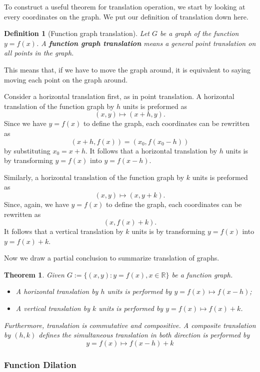 \documentclass[12pt]{article}
\newtheorem{definition}{Definition}[section]
\newtheorem*{theorem}{Theorem}
\begin{document}
    To construct a useful theorem for translation operation, we start by looking at every coordinates on the graph. We put our definition of translation down here.

    \begin{definition}[Function graph translation]
        Let $G$ be a graph of the function $y=f(x)$. A \textbf{function graph translation} means a general point translation on all points in the graph.
    \end{definition}

    This means that, if we have to move the graph around, it is equivalent to saying moving each point on the graph around.

    Consider a horizontal translation first, as in point translation. A horizontal translation of the function graph by $h$ units is preformed as \[(x,y)\mapsto (x+h,y).\] Since we have $y=f(x)$ to define the graph, each coordinates can be rewritten as \[(x+h,f(x))=(x_0,f(x_0-h))\] by substituting $x_0=x+h$. It follows that a horizontal translation by $h$ units is by transforming $y=f(x)$ into $y=f(x-h)$.

    Similarly, a horizontal translation of the function graph by $k$ units is preformed as \[(x,y)\mapsto (x,y+k).\] Since, again, we have $y=f(x)$ to define the graph, each coordinates can be rewritten as \[(x,f(x)+k).\] It follows that a vertical translation by $k$ units is by transforming $y=f(x)$ into $y=f(x)+k$.

    Now we draw a partial conclusion to summarize translation of graphs.

    \begin{theorem}
        Given $G:=\{(x,y):y=f(x),x\in\mathbb{R}\}$ be a function graph.\begin{itemize}
            \item A horizontal translation by $h$ units is performed by $y=f(x)\mapsto f(x-h)$;
            \item A vertical translation by $k$ units is performed by $y=f(x)\mapsto f(x)+k$.
        \end{itemize}
        Furthermore, translation is commutative and compositive. A composite translation by $(h,k)$ defines the simultaneous translation in both direction is performed by \[y=f(x)\mapsto f(x-h)+k\]
    \end{theorem}

    \subsubsection*{Function Dilation}
\end{document}
